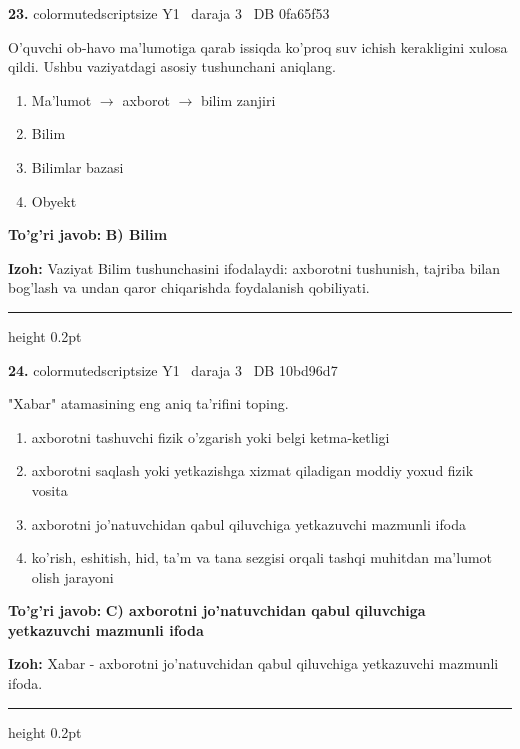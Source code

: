 \documentclass[10pt,a4paper,oneside]{article}
\begin{document}
\noindent\textbf{\color{ink}23.}  {color{muted}scriptsize Y1 \textbullet\ daraja 3 \textbullet\ DB 0fa65f53}
\par
O'quvchi ob-havo ma'lumotiga qarab issiqda ko'proq suv ichish kerakligini xulosa qildi. Ushbu vaziyatdagi asosiy tushunchani aniqlang.
\begin{enumerate}[label=\Alph*),leftmargin=9mm]
\item Ma'lumot \ensuremath{\to} axborot \ensuremath{\to} bilim zanjiri
\item Bilim
\item Bilimlar bazasi
\item Obyekt
\end{enumerate}
\begin{tcolorbox}[enhanced,breakable,colback=teal!4,colframe=teal!50!black,boxrule=0.5pt,arc=1.1mm,left=3mm,right=3mm,top=1.7mm,bottom=1.7mm,before skip=2mm,after skip=2mm]
\textbf{\color{teal}To'g'ri javob:} \textbf{B) Bilim}
\par\smallskip
\textbf{Izoh:} Vaziyat Bilim tushunchasini ifodalaydi: axborotni tushunish, tajriba bilan bog'lash va undan qaror chiqarishda foydalanish qobiliyati.
\end{tcolorbox}
\vspace{2mm}\hrule height 0.2pt \vspace{3mm}

\noindent\textbf{\color{ink}24.}  {color{muted}scriptsize Y1 \textbullet\ daraja 3 \textbullet\ DB 10bd96d7}
\par
"Xabar" atamasining eng aniq ta'rifini toping.
\begin{enumerate}[label=\Alph*),leftmargin=9mm]
\item axborotni tashuvchi fizik o'zgarish yoki belgi ketma-ketligi
\item axborotni saqlash yoki yetkazishga xizmat qiladigan moddiy yoxud fizik vosita
\item axborotni jo'natuvchidan qabul qiluvchiga yetkazuvchi mazmunli ifoda
\item ko'rish, eshitish, hid, ta'm va tana sezgisi orqali tashqi muhitdan ma'lumot olish jarayoni
\end{enumerate}
\begin{tcolorbox}[enhanced,breakable,colback=teal!4,colframe=teal!50!black,boxrule=0.5pt,arc=1.1mm,left=3mm,right=3mm,top=1.7mm,bottom=1.7mm,before skip=2mm,after skip=2mm]
\textbf{\color{teal}To'g'ri javob:} \textbf{C) axborotni jo'natuvchidan qabul qiluvchiga yetkazuvchi mazmunli ifoda}
\par\smallskip
\textbf{Izoh:} Xabar - axborotni jo'natuvchidan qabul qiluvchiga yetkazuvchi mazmunli ifoda.
\end{tcolorbox}
\vspace{2mm}\hrule height 0.2pt \vspace{3mm}
\end{document}
